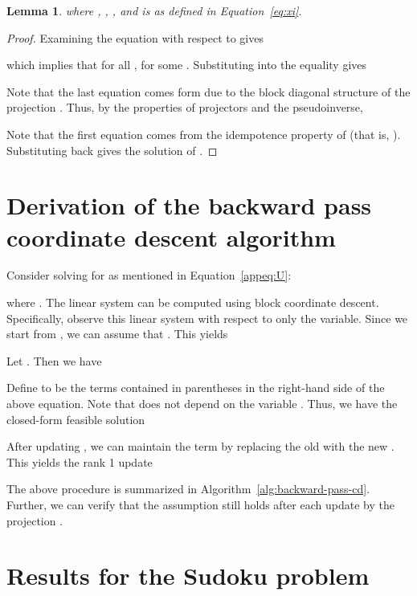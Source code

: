 \documentclass{article}
\newtheorem{lemma}[theorem]{Lemma}
\begin{document}
{{\begin{lemma}
		where , , , and  is as defined in Equation~\eqref{eq:xi}.
	\end{lemma}
	\begin{proof}
		Examining the equation with respect to  gives
		
		which implies that for all ,  for some .
		Substituting  into the equality gives
		
		Note that the last equation comes form  due to the block diagonal structure of the projection .
		Thus, by the properties of projectors and the pseudoinverse,
		
		Note that the first equation comes from the idempotence property of  (that is, ).
		Substituting  back gives the solution of .
	\end{proof}
	
	\section{Derivation of the backward pass coordinate descent algorithm}
	\label{appsec:back-cd}
	Consider solving for  as mentioned in Equation~\eqref{appeq:U}:
	
	where .
	The linear system can be computed using block coordinate descent.
	Specifically, observe this linear system with respect to only the  variable. Since we start from , we can assume that . This yields
	
	Let . Then we have
	
	Define  to be the terms contained in parentheses in the right-hand side of the above equation. Note that  does not depend on the variable . Thus, we have the closed-form feasible solution
	
	After updating , we can maintain the term  by replacing the old  with the new . This yields the rank 1 update
	
	The above procedure is summarized in Algorithm~\ref{alg:backward-pass-cd}. Further, we can verify that the assumption  still holds after each update by the projection .
	
	\section{Results for the  Sudoku problem}
	\label{appsec:sudoku-4}
	










    \begin{figure*}[t!]
		\centering
		

\end{figure*}}}
\end{document}
